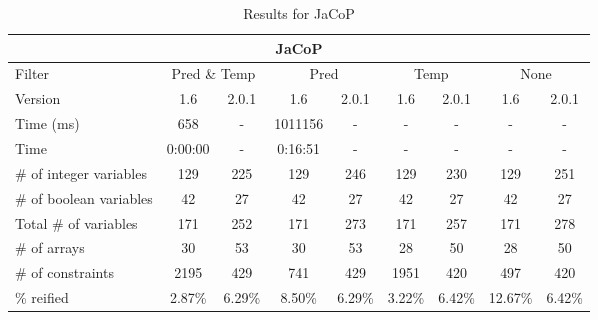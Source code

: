 \documentclass{standalone}
\begin{document}
\begin{table}[H]
\footnotesize
\centering
\begin{tabular}{lc|c|c|c|c|c|c|c}
\multicolumn{9}{c}{JaCoP} \\ 
\hline\hline Filter & \multicolumn{2}{c|}{Pred \& Temp} &\multicolumn{2}{c|}{Pred}  & \multicolumn{2}{c|}{Temp} & \multicolumn{2}{c}{None} \\ 
\hline Version & 1.6 & 2.0.1 & 1.6 & 2.0.1 & 1.6 & 2.0.1 & 1.6 & 2.0.1 \\ 
Time (ms)               & 658 & - & 1011156 & - & - & - & - & - \\
Time                    & 0:00:00 & - & 0:16:51 & - & - & - & - & - \\ 
\# of integer variables & 129 & 225 & 129 & 246 & 129 & 230 & 129 & 251 \\ 
\# of boolean variables & 42 & 27 & 42 & 27 & 42 & 27 & 42 & 27 \\ 
Total \# of variables   & 171 & 252 & 171 & 273 & 171 & 257 & 171 & 278 \\ 
\# of arrays            & 30 & 53 & 30 & 53 & 28 & 50 & 28 & 50 \\ 
\# of constraints       & 2195 & 429 & 741 & 429 & 1951 & 420 & 497 & 420 \\ 
\% reified               & 2.87\% & 6.29\% & 8.50\% & 6.29\% & 3.22\% & 6.42\% & 12.67\% & 6.42\% \\ 
\end{tabular}
\caption{Results for JaCoP}\label{tab:res_jacop}
\end{table}
\end{document}
